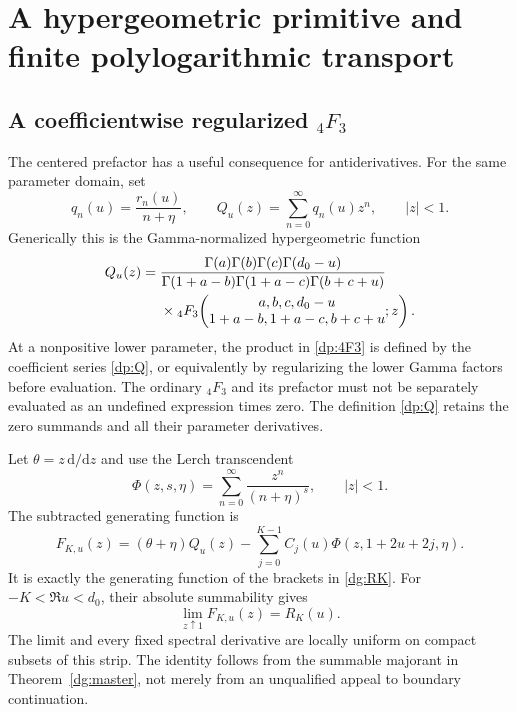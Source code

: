 \section{A hypergeometric primitive and finite polylogarithmic transport}
\label{dp:section}

\subsection{A coefficientwise regularized \texorpdfstring{${}_4F_3$}{4F3}}
The centered prefactor has a useful consequence for antiderivatives.
For the same parameter domain, set
\begin{equation}\label{dp:Q}
 q_n(u)=\frac{r_n(u)}{n+\eta},\qquad
 Q_u(z)=\sum_{n=0}^{\infty}q_n(u)z^n,\qquad |z|<1.
\end{equation}
Generically this is the Gamma-normalized hypergeometric function
\begin{align}
 Q_u(z)={}&
 \frac{\Gamma(a)\Gamma(b)\Gamma(c)\Gamma(d_0-u)}
 {\Gamma(1+a-b)\Gamma(1+a-c)\Gamma(b+c+u)}\notag\\
 &\times{}_4F_3\!\left(\begin{matrix}
 a,b,c,d_0-u\\1+a-b,1+a-c,b+c+u
 \end{matrix};z\right).
 \label{dp:4F3}
\end{align}
At a nonpositive lower parameter, the product in \eqref{dp:4F3} is
defined by the coefficient series \eqref{dp:Q}, or equivalently by
regularizing the lower Gamma factors before evaluation. The ordinary
${}_4F_3$ and its prefactor must not be separately evaluated as an
undefined expression times zero. The definition \eqref{dp:Q} retains
the zero summands and all their parameter derivatives.

Let $\theta=z\,\mathrm d/\mathrm dz$ and use the Lerch transcendent
\cite[Section 25.14]{dlmf-lerch}
\[
 \Phi(z,s,\eta)=\sum_{n=0}^{\infty}\frac{z^n}{(n+\eta)^s},
 \qquad |z|<1.
\]
The subtracted generating function is
\begin{equation}\label{dp:F}
 F_{K,u}(z)=(\theta+\eta)Q_u(z)
        -\sum_{j=0}^{K-1}C_j(u)\Phi(z,1+2u+2j,\eta).
\end{equation}
It is exactly the generating function of the brackets in
\eqref{dg:RK}. For $-K<\Re u<d_0$, their absolute summability gives
\begin{equation}\label{dp:endpoint}
 \lim_{z\uparrow1}F_{K,u}(z)=R_K(u).
\end{equation}
The limit and every fixed spectral derivative are locally uniform on
compact subsets of this strip. The identity follows from the
summable majorant in Theorem~\ref{dg:master}, not merely from an
unqualified appeal to boundary continuation.

